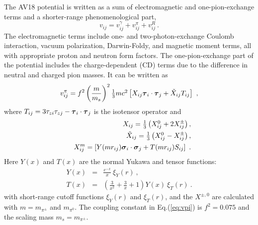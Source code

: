 The AV18 potential is written as a sum of electromagnetic  and
one-pion-exchange terms and a shorter-range phenomenological part,
\begin{equation}
   v_{ij} = v^{\gamma}_{ij} + v^{\pi}_{ij} + v^{R}_{ij} \ .
\end{equation}
The electromagnetic terms include one- and two-photon-exchange Coulomb
interaction, vacuum polarization, Darwin-Foldy, and magnetic moment terms,
all with appropriate proton and neutron form factors.
The one-pion-exchange part of the potential includes the charge-dependent (CD)
terms due to the difference in neutral and charged pion masses.
It can be written as
\begin{equation}
   v^{\pi}_{ij} = f^{2} \left(\frac{m}{m_{s}}\right)^{2} \textstyle{1\over3}
                 mc^{2} \left[ X_{ij} \mbox{\boldmath$\tau$}_{i} \cdot \mbox{\boldmath$\tau$}_{j}
                      + \tilde{X}_{ij} T_{ij} \right] \ ,
\label{eq:vpi}
\end{equation}
where $T_{ij} = 3\tau_{zi}\tau_{zj}-\mbox{\boldmath$\tau$}_{i}\cdot\mbox{\boldmath$\tau$}_{j}$ is the 
isotensor operator and
\begin{eqnarray}
   && X_{ij} = \textstyle{1\over3} \left( X^{0}_{ij} + 2 X^{\pm}_{ij} \right) , \\
   && \tilde{X}_{ij} = \textstyle{1\over3} \left( X^{0}_{ij} - X^{\pm}_{ij}
                                      \right) , \\
   && X^{m}_{ij} =  \left[ Y(mr_{ij}) \mbox{\boldmath$\sigma$}_{i} \cdot \mbox{\boldmath$\sigma$}_{j} +
                           T(mr_{ij}) S_{ij}  \right] \ .
\end{eqnarray}
Here $Y(x)$ and $T(x)$ are the normal Yukawa and tensor functions:
\begin{eqnarray}
Y(x) &=& \frac{e^{-x}}{x} \  \xi_Y(r) \ ,
\label{eq:yij}   \\
T(x) &=& \left( \frac{3}{x^2} + \frac{3}{x} + 1 \right) Y(x) \  \xi_T(r) \ .
\label{eq:tij}
\end{eqnarray}
with short-range cutoff functions $\xi_Y(r)$ and $\xi_T(r)$, and the 
$X^{\pm,0}$ are calculated with $m = m_{\pi^{\pm}}$ and $m_{\pi^{0}}$.
The coupling constant in Eq.(\ref{eq:vpi}) is $f^2 = 0.075$ and the scaling
mass $m_s = m_{\pi^{\pm}}$.

